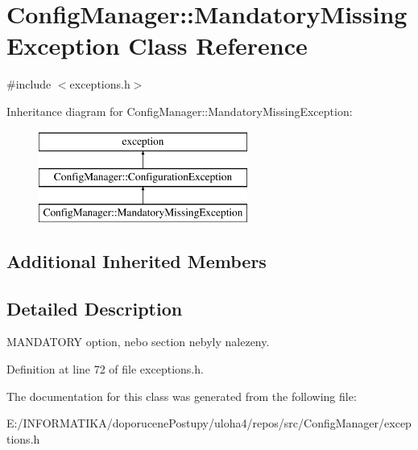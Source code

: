 \hypertarget{class_config_manager_1_1_mandatory_missing_exception}{}\section{Config\+Manager\+:\+:Mandatory\+Missing\+Exception Class Reference}
\label{class_config_manager_1_1_mandatory_missing_exception}


{\ttfamily \#include $<$exceptions.\+h$>$}

Inheritance diagram for Config\+Manager\+:\+:Mandatory\+Missing\+Exception\+:\begin{figure}[H]
\begin{center}
\leavevmode
\includegraphics[height=3.000000cm]{class_config_manager_1_1_mandatory_missing_exception}
\end{center}
\end{figure}
\subsection*{Additional Inherited Members}


\subsection{Detailed Description}
M\+A\+N\+D\+A\+T\+O\+RY option, nebo section nebyly nalezeny. 

Definition at line 72 of file exceptions.\+h.



The documentation for this class was generated from the following file\+:\begin{DoxyCompactItemize}
\item 
E\+:/\+I\+N\+F\+O\+R\+M\+A\+T\+I\+K\+A/doporucene\+Postupy/uloha4/repos/src/\+Config\+Manager/exceptions.\+h\end{DoxyCompactItemize}
